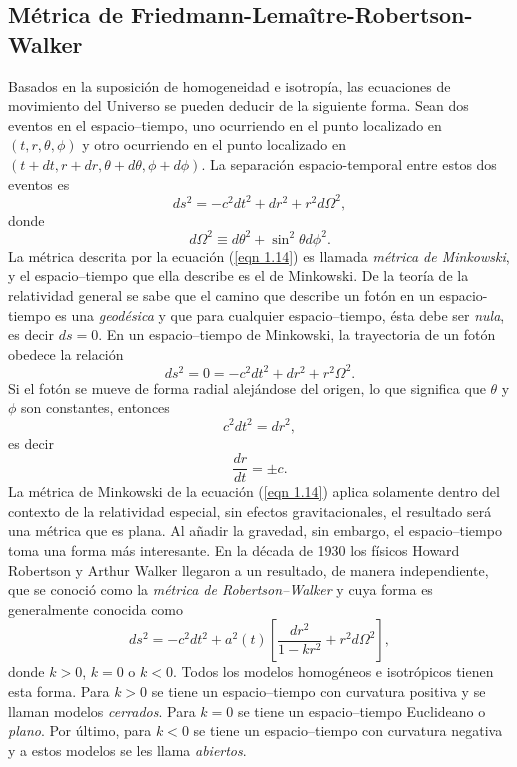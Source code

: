 \documentclass[a4paper,openright,12pt]{book}
\begin{document}

\subsection*{Métrica de Friedmann-Lemaître-Robertson-Walker}
Basados en la suposición de homogeneidad e isotropía, las ecuaciones de movimiento del Universo se pueden deducir de la siguiente forma. Sean dos eventos en el espacio--tiempo, uno ocurriendo en el punto localizado en $(t,r,\theta , \phi)$ y otro ocurriendo en el punto localizado en $(t +dt, r + dr, \theta + d\theta, \phi + d\phi)$. La separación espacio-temporal entre estos dos eventos es
\begin{equation}
ds^{2}=-c^{2}dt^{2} + dr^{2} +r^{2}d\Omega^{2},\label{eqn 1.14}
\end{equation}
donde
\begin{equation*}
d\Omega^{2} \equiv d\theta^{2} + \sin^{2}\theta d\phi^{2}.
\end{equation*}
La métrica descrita por la ecuación (\ref{eqn 1.14}) es llamada \textit{métrica de Minkowski}, y el espacio--tiempo que ella describe es el de Minkowski. De la teoría de la relatividad general se sabe que el camino que describe un fotón en un espacio-tiempo es una \textit{geodésica} y que para cualquier espacio--tiempo, ésta debe ser \textit{nula}, es decir $ds=0$. En un espacio--tiempo de Minkowski, la trayectoria de un fotón obedece la relación
\begin{equation}
ds^{2}=0 = -c^{2}dt^{2} + dr^{2} +r^{2}\Omega^{2}.\label{eqn 1.15}
\end{equation}
Si el fotón se mueve de forma radial alejándose del origen, lo que significa que $\theta$ y $\phi$ son constantes, entonces
\begin{equation}
c^{2}dt^{2}=dr^{2},\label{eqn 1.16}
\end{equation}
es decir
\begin{equation}
\frac{dr}{dt}=\pm c. \label{eqn 1.17}
\end{equation}
La métrica de Minkowski de la ecuación (\ref{eqn 1.14}) aplica solamente dentro del contexto de la relatividad especial, sin efectos gravitacionales, el resultado será una  métrica que es plana. Al añadir la gravedad, sin embargo, el espacio--tiempo toma una forma más interesante. En la década de 1930 los físicos Howard Robertson y Arthur Walker llegaron a un resultado, de manera independiente, que se conoció como la \textit{métrica de Robertson--Walker} y cuya forma es generalmente conocida como
\begin{equation}
ds^{2}
=
-c^{2}dt^{2} + a^{2}(t)
\left[
\frac{dr^{2}}{1-k r^{2}} + r^{2}d\Omega^{2}
\right],\label{eqn 1.18}
\end{equation}
donde $k > 0$, $k = 0$ o $k < 0$. Todos los modelos homogéneos e isotrópicos tienen esta forma. Para $k > 0$ se tiene un espacio--tiempo con curvatura positiva y se llaman modelos \textit{cerrados}. Para $k = 0$ se tiene un espacio--tiempo Euclideano o \textit{plano}. Por último, para $k < 0$ se tiene un espacio--tiempo con curvatura negativa y a estos modelos se les llama \textit{abiertos}.
\end{document}
